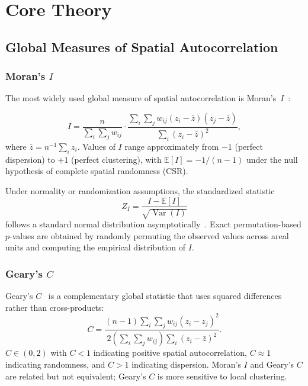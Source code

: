 \documentclass[conference]{IEEEtran}
\theoremstyle{definition}
\begin{document}
\section{Core Theory}
\label{sec:theory}

\subsection{Global Measures of Spatial Autocorrelation}

\subsubsection{Moran's $I$}

The most widely used global measure of spatial autocorrelation is Moran's~$I$~\cite{moran1950}:

\begin{equation}
I = \frac{n}{\sum_{i}\sum_{j} w_{ij}} \cdot \frac{\sum_{i}\sum_{j} w_{ij}(z_i - \bar{z})(z_j - \bar{z})}{\sum_{i}(z_i - \bar{z})^2},
\label{eq:morans_I}
\end{equation}
where $\bar{z} = n^{-1}\sum_i z_i$. Values of $I$ range approximately from $-1$ (perfect dispersion) to $+1$ (perfect clustering), with $\mathbb{E}[I] = -1/(n-1)$ under the null hypothesis of complete spatial randomness (CSR).

Under normality or randomization assumptions, the standardized statistic
\begin{equation}
Z_I = \frac{I - \mathbb{E}[I]}{\sqrt{\operatorname{Var}(I)}}
\end{equation}
follows a standard normal distribution asymptotically~\cite{cliff1981}. Exact permutation-based $p$-values are obtained by randomly permuting the observed values across areal units and computing the empirical distribution of $I$.

\subsubsection{Geary's $C$}

Geary's $C$~\cite{geary1954} is a complementary global statistic that uses squared differences rather than cross-products:
\begin{equation}
C = \frac{(n-1)\sum_{i}\sum_{j} w_{ij}(z_i - z_j)^2}{2\left(\sum_{i}\sum_{j} w_{ij}\right)\sum_{i}(z_i - \bar{z})^2}.
\end{equation}
$C \in (0,2)$ with $C < 1$ indicating positive spatial autocorrelation, $C \approx 1$ indicating randomness, and $C > 1$ indicating dispersion. Moran's $I$ and Geary's $C$ are related but not equivalent; Geary's $C$ is more sensitive to local clustering.
\end{document}

